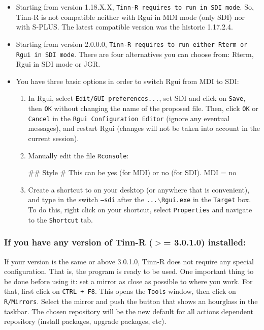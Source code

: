 \begin{itemize}
  \item Starting from version 1.18.X.X, \texttt{Tinn-R requires
      \RR{} to run in SDI mode}. So, Tinn-R is not compatible neither
    with Rgui in MDI mode (only SDI) nor with S-PLUS. The
    latest compatible version was the historic 1.17.2.4.
  \item Starting from version 2.0.0.0, \texttt{Tinn-R requires
      \RR{} to run either Rterm or Rgui in SDI mode}. There are four
    alternatives you can choose from: Rterm, Rgui in SDI mode or JGR.
  \item You have three basic options in order to switch Rgui from
    MDI to SDI:
    \begin{enumerate}
      \item In Rgui, select \texttt{Edit/GUI preferences...},
        set SDI and click on \texttt{Save}, then \texttt{OK}
        without changing the name of the proposed file. Then,
        click \texttt{OK} or \texttt{Cancel} in the
        \texttt{Rgui Configuration Editor} (ignore any eventual
        messages), and restart Rgui (changes will not be taken
        into account in the current session).
      \item Manually edit the file \texttt{Rconsole}:
        \begin{Scode}
          ## Style
          # This can be yes (for MDI) or no (for SDI).
          MDI = no
        \end{Scode}
      \item Create a shortcut to \RR{} on your desktop (or anywhere that is convenient),
        and type in the switch \texttt{--sdi} after the \texttt{...$\backslash$Rgui.exe}
        in the \texttt{Target} box. To do this, right click on your shortcut, select
        \texttt{Properties} and navigate to the \texttt{Shortcut} tab.
    \end{enumerate}
\end{itemize}


\subsubsection{If you have any version of Tinn-R ($>$= 3.0.1.0) installed:}

If your version is the same or above 3.0.1.0, Tinn-R does not require any special configuration.
That is, the program is ready to be used. One important thing to be done before using it:
set a \RR{} mirror as close as possible to where you work. For that, first click on \texttt{CTRL + F8}.
This opens the \texttt{Tools} window, then click on \texttt{R/Mirrors}.
Select the \RR{} mirror and push the button that shows an hourglass in the taskbar.
The chosen repository will be the new default for all actions dependent repository
(install packages, upgrade packages, etc).



